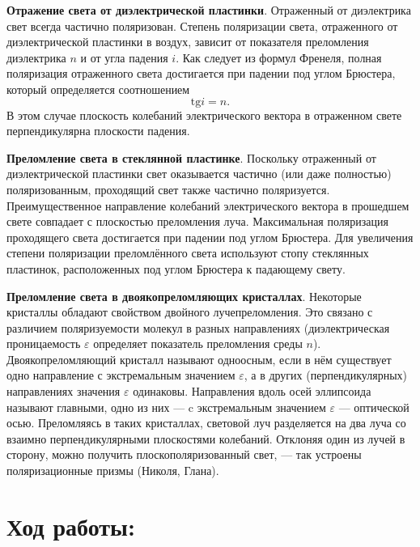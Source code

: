 \documentclass[11pt]{article}
\begin{document}
    \textbf{Отражение света от диэлектрической пластинки}. Отраженный от диэлектрика свет всегда частично поляризован. Степень поляризации света, отраженного от диэлектрической пластинки в воздух, зависит от показателя преломления диэлектрика $n$ и от угла падения $i$. Как следует из формул Френеля, полная поляризация отраженного света достигается при падении под углом Брюстера, который определяется соотношением
    \begin{equation}
    \text{tg}i = n.
    \end{equation}
    В этом случае плоскость колебаний электрического вектора в отраженном свете перпендикулярна плоскости падения.
    
    \textbf{Преломление света в стеклянной пластинке}. Поскольку отраженный от
    диэлектрической пластинки свет оказывается частично (или даже полностью) поляризованным, проходящий свет также частично поляризуется. Преимущественное направление колебаний электрического вектора
    в прошедшем свете совпадает с плоскостью преломления луча. Максимальная поляризация проходящего света достигается при падении под
    углом Брюстера. Для увеличения степени поляризации преломлённого
    света используют стопу стеклянных пластинок, расположенных под углом Брюстера к падающему свету.
    
    \textbf{Преломление света в двоякопреломляющих кристаллах}. Некоторые кристаллы обладают свойством двойного лучепреломления. Это связано с различием поляризуемости молекул в разных направлениях (диэлектрическая проницаемость $\varepsilon$ определяет показатель преломления среды $n$).
    Двоякопреломляющий кристалл называют одноосным, если в нём существует одно направление с экстремальным значением $\varepsilon$, а в других (перпендикулярных) направлениях значения $\varepsilon$ одинаковы. Направления вдоль осей эллипсоида называют главными, одно из них --- c экстремальным значением $\varepsilon$ --- оптической осью. Преломляясь в таких кристаллах, световой луч разделяется на два луча со взаимно перпендикулярными плоскостями колебаний. Отклоняя    один из лучей в сторону, можно получить плоскополяризованный свет, --- так устроены поляризационные призмы (Николя, Глана).
    







\section{Ход работы:}
\end{document}
